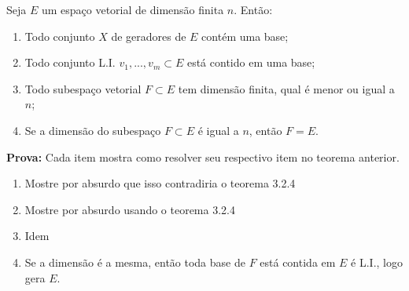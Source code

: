 \documentclass[../main.tex]{subfiles}
\begin{document}
	\begin{teorema}
		Seja $E$ um espaço vetorial de dimensão finita $n$. Então:
		\begin{enumerate}
			\item Todo conjunto $X$ de geradores de $E$ contém uma base;
			\item Todo conjunto L.I. ${v_1,...,v_m} \subset E$ está contido em uma base; 
			\item Todo subespaço vetorial $F \subset E$ tem dimensão finita, qual é menor ou igual a $n$;
			\item Se a dimensão do subespaço $F \subset E$ é igual a $n$, então $F=E$.
		\end{enumerate}
	\end{teorema}
	\textbf{Prova:} Cada item mostra como resolver seu respectivo item no teorema anterior.
		\begin{enumerate}
			\item Mostre por absurdo que isso contradiria o teorema 3.2.4
			\item Mostre por absurdo usando o teorema 3.2.4
			\item Idem
			\item Se a dimensão é a mesma, então toda base de $F$ está contida em $E$ é L.I., logo gera $E$.
		\end{enumerate}
	
\end{document}
